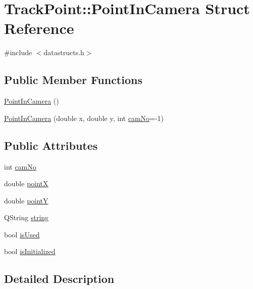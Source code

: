 \hypertarget{struct_track_point_1_1_point_in_camera}{}\section{Track\+Point\+::Point\+In\+Camera Struct Reference}
\label{struct_track_point_1_1_point_in_camera}


{\ttfamily \#include $<$datastructs.\+h$>$}

\subsection*{Public Member Functions}
\begin{DoxyCompactItemize}
\item 
\mbox{\hyperlink{struct_track_point_1_1_point_in_camera_ae0b3c98aea0a52506f1fab2c2ea3ae19}{Point\+In\+Camera}} ()
\item 
\mbox{\hyperlink{struct_track_point_1_1_point_in_camera_ac9468bb4df9c6dc5687e5c342d447b19}{Point\+In\+Camera}} (double x, double y, int \mbox{\hyperlink{struct_track_point_1_1_point_in_camera_a4121d785ea9abc9b1e7207c3e8b2c588}{cam\+No}}=-\/1)
\end{DoxyCompactItemize}
\subsection*{Public Attributes}
\begin{DoxyCompactItemize}
\item 
int \mbox{\hyperlink{struct_track_point_1_1_point_in_camera_a4121d785ea9abc9b1e7207c3e8b2c588}{cam\+No}}
\item 
double \mbox{\hyperlink{struct_track_point_1_1_point_in_camera_a1b25bead4de7a834679d95426378774f}{pointX}}
\item 
double \mbox{\hyperlink{struct_track_point_1_1_point_in_camera_ad761e88d291aefd02f737511e3c3cd19}{pointY}}
\item 
Q\+String \mbox{\hyperlink{struct_track_point_1_1_point_in_camera_ae1c5c53619d9800329288dd6996527ca}{string}}
\item 
bool \mbox{\hyperlink{struct_track_point_1_1_point_in_camera_aef75536fa2f26a8bcf1ccd59f1a7a960}{is\+Used}}
\item 
bool \mbox{\hyperlink{struct_track_point_1_1_point_in_camera_a53d5401c085a20ecacf564a76d6471f2}{is\+Initialized}}
\end{DoxyCompactItemize}


\subsection{Detailed Description}


